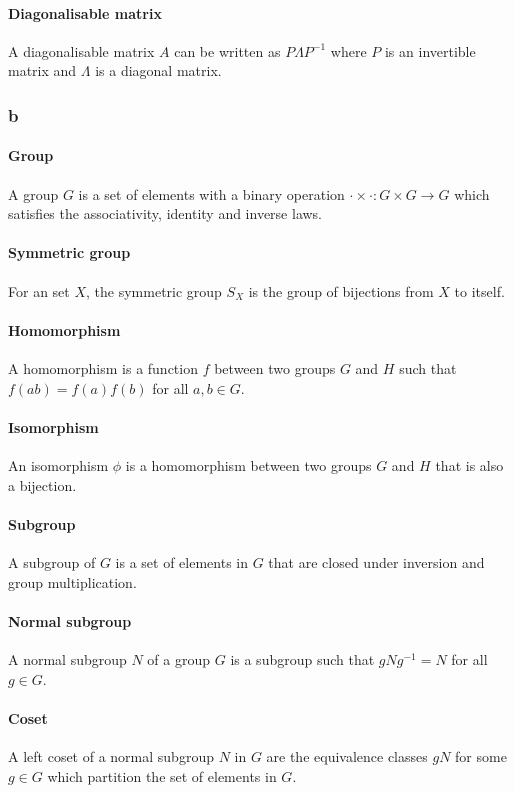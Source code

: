 \documentclass[]{article}
\begin{document}
\paragraph{Diagonalisable matrix} A diagonalisable matrix $A$ can be written as $P \Lambda P^{-1}$ where $P$ is an invertible matrix and $\Lambda$ is a diagonal matrix.
\subsubsection*{b}
\paragraph{Group}
A group $G$ is a set of elements with a binary operation $ \cdot \times \cdot : G \times G \rightarrow G$ which satisfies the associativity, identity and inverse laws.
\paragraph{Symmetric group} For an set $X$, the symmetric group $S_X$ is the group of bijections from $X$ to itself. 
\paragraph{Homomorphism} A homomorphism is a function $f$ between two groups $G$ and $H$ such that $f(ab) = f(a) f(b)$ for all $a, b \in G$. 
\paragraph{Isomorphism} An isomorphism $\phi$ is a homomorphism between two groups $G$ and $H$ that is also a bijection.
\paragraph{Subgroup} A subgroup of $G$ is a set of elements in $G$ that are closed under inversion and group multiplication. 
\paragraph{Normal subgroup} A normal subgroup $N$ of a group $G$ is a subgroup such that $g N g^{-1} = N$ for all $g \in G$. 
\paragraph{Coset} A left coset of a normal subgroup $N$ in $G$ are the equivalence classes $gN$ for some $g \in G$ which partition the set of elements in $G$.
\end{document}
